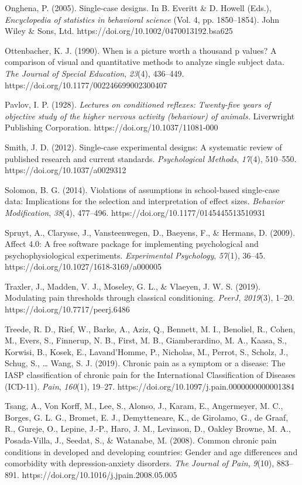 \documentclass{article}
\begin{document}
Onghena, P. (2005). Single-case designs. In B. Everitt \& D. Howell (Eds.), \emph{Encyclopedia of statistics in behavioral science} (Vol. 4, pp. 1850--1854). John Wiley \& Sons, Ltd. https://doi.org/10.1002/0470013192.bsa625

Ottenbacher, K. J. (1990). When is a picture worth a thousand p values? A comparison of visual and quantitative methods to analyze single subject data. \emph{The Journal of Special Education}, \emph{23}(4), 436--449. https://doi.org/10.1177/002246699002300407

Pavlov, I. P. (1928). \emph{Lectures on conditioned reflexes: Twenty-five years of objective study of the higher nervous activity (behaviour) of animals.} Liverwright Publishing Corporation. https://doi.org/10.1037/11081-000

Smith, J. D. (2012). Single-case experimental designs: A systematic review of published research and current standards. \emph{Psychological Methods}, \emph{17}(4), 510--550. https://doi.org/10.1037/a0029312

Solomon, B. G. (2014). Violations of assumptions in school-based single-case data: Implications for the selection and interpretation of effect sizes. \emph{Behavior Modification}, \emph{38}(4), 477--496. https://doi.org/10.1177/0145445513510931

Spruyt, A., Clarysse, J., Vansteenwegen, D., Baeyens, F., \& Hermans, D. (2009). Affect 4.0: A free software package for implementing psychological and psychophysiological experiments. \emph{Experimental Psychology}, \emph{57}(1), 36--45. https://doi.org/10.1027/1618-3169/a000005

Traxler, J., Madden, V. J., Moseley, G. L., \& Vlaeyen, J. W. S. (2019). Modulating pain thresholds through classical conditioning. \emph{PeerJ}, \emph{2019}(3), 1--20. https://doi.org/10.7717/peerj.6486

Treede, R. D., Rief, W., Barke, A., Aziz, Q., Bennett, M. I., Benoliel, R., Cohen, M., Evers, S., Finnerup, N. B., First, M. B., Giamberardino, M. A., Kaasa, S., Korwisi, B., Kosek, E., Lavand'Homme, P., Nicholas, M., Perrot, S., Scholz, J., Schug, S., … Wang, S. J. (2019). Chronic pain as a symptom or a disease: The IASP classification of chronic pain for the International Classification of Diseases (ICD-11). \emph{Pain}, \emph{160}(1), 19--27. https://doi.org/10.1097/j.pain.0000000000001384

Tsang, A., Von Korff, M., Lee, S., Alonso, J., Karam, E., Angermeyer, M. C., Borges, G. L. G., Bromet, E. J., Demytteneare, K., de Girolamo, G., de Graaf, R., Gureje, O., Lepine, J.-P., Haro, J. M., Levinson, D., Oakley Browne, M. A., Posada-Villa, J., Seedat, S., \& Watanabe, M. (2008). Common chronic pain conditions in developed and developing countries: Gender and age differences and comorbidity with depression-anxiety disorders. \emph{The Journal of Pain}, \emph{9}(10), 883--891. https://doi.org/10.1016/j.jpain.2008.05.005
\end{document}
